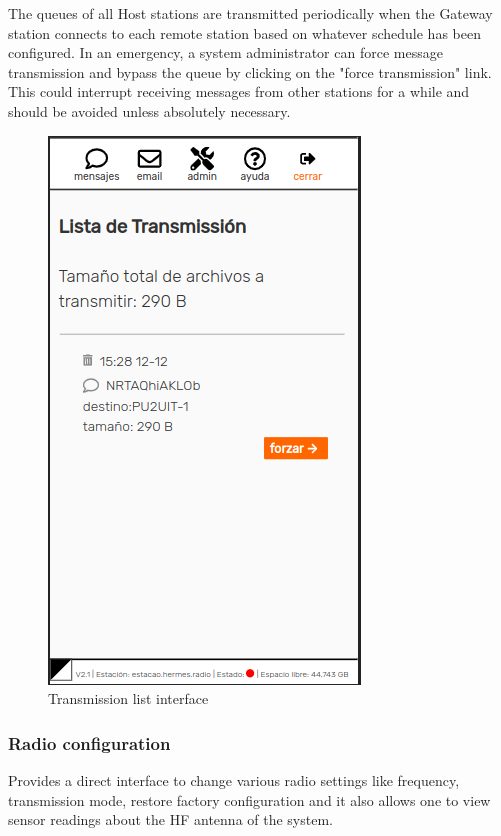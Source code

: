 \documentclass[11pt,a4paper]{article}
\begin{document}
The queues of all Host stations are transmitted periodically when the Gateway station connects to each remote station based on whatever schedule has been configured. In an emergency, a system administrator can force message transmission and bypass the queue by clicking on the "force transmission" link. This could interrupt receiving messages from other stations for a while and should be avoided unless absolutely necessary.   
    \begin{figure}[H]
    \centering
    \includegraphics[width=0.5\columnwidth]{screenshots/frontend/es/transmission.png}
    \caption{Transmission list interface}
    \label{fig:transmission}
   
    \end{figure}    
    
    
\subsubsection{Radio configuration}
\label{gui_radio_config}

Provides a direct interface to change various radio settings like frequency, transmission mode, restore factory configuration and it also allows one to view sensor readings about the HF antenna of the system. %
\end{document}
